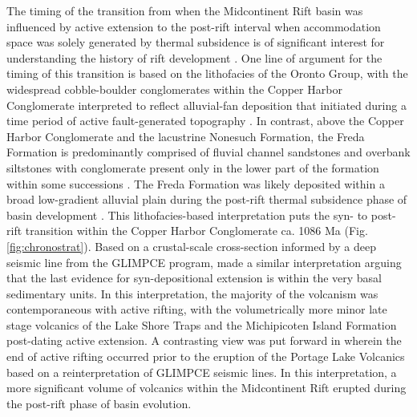 \documentclass[11pt,letterpaper]{article}
\begin{document}
The timing of the transition from when the Midcontinent Rift basin was influenced by active extension to the post-rift interval when accommodation space was solely generated by thermal subsidence is of significant interest for understanding the history of rift development \citep{Cannon1992b,Stein2015a}. One line of argument for the timing of this transition is based on the lithofacies of the Oronto Group, with the widespread cobble-boulder conglomerates within the Copper Harbor Conglomerate interpreted to reflect alluvial-fan deposition that initiated during a time period of active fault-generated topography \citep{Elmore1984a, Zartman1997a}. In contrast, above the Copper Harbor Conglomerate and the lacustrine Nonesuch Formation, the Freda Formation is predominantly comprised of fluvial channel sandstones and overbank siltstones with conglomerate present only in the lower part of the formation within some successions \citep{Ojakangas2001a}. The Freda Formation was likely deposited within a broad low-gradient alluvial plain during the post-rift thermal subsidence phase of basin development \citep{Zartman1997a}. This lithofacies-based interpretation puts the syn- to post-rift transition within the Copper Harbor Conglomerate ca. 1086 Ma (Fig. \ref{fig:chronostrat}). Based on a crustal-scale cross-section informed by a deep seismic line from the GLIMPCE program, \cite{Cannon1992b} made a similar interpretation arguing that the last evidence for syn-depositional extension is within the very basal sedimentary units. In this interpretation, the majority of the volcanism was contemporaneous with active rifting, with the volumetrically more minor late stage volcanics of the Lake Shore Traps and the Michipicoten Island Formation post-dating active extension. A contrasting view was put forward in \cite{Stein2015a} wherein the end of active rifting occurred prior to the eruption of the Portage Lake Volcanics based on a reinterpretation of GLIMPCE seismic lines. In this interpretation, a more significant volume of volcanics within the Midcontinent Rift erupted during the post-rift phase of basin evolution.
\end{document}
